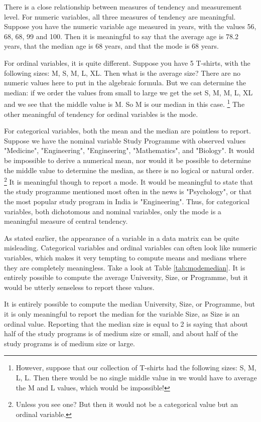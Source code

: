 \documentclass[]{book}\usepackage[]{graphicx}\usepackage[]{color}
\begin{document}
There is a close relationship between measures of tendency and measurement level. For numeric variables, all three measures of tendency are meaningful. Suppose you have the numeric variable age measured in years, with the values 56, 68, 68, 99 and 100. Then it is meaningful to say that the average age is 78.2 years, that the median age is 68 years, and that the mode is 68 years.

For ordinal variables, it is quite different. Suppose you have 5 T-shirts, with the following sizes: M, S, M, L, XL. Then what is the average size? There are no numeric values here to put in the algebraic formula. But we can determine the median: if we order the values from small to large we get the set S, M, M, L, XL and we see that the middle value is M. So M is our median in this case. \footnote{However, suppose that our collection of T-shirts had the following sizes: S, M, L, L. Then there would be no single middle value in we would have to average the M and L values, which would be impossible!} The other meaningful of tendency for ordinal variables is the mode.

For categorical variables, both the mean and the median are pointless to report. Suppose we have the nominal variable Study Programme with observed values "Medicine", "Engineering", "Engineering", "Mathematics", and "Biology". It would be impossible to derive a numerical mean, nor would it be possible to determine the middle value to determine the median, as there is no logical or natural order. \footnote{Unless you see one? But then it would not be a categorical value but an ordinal variable.} It is meaningful though to report a mode. It would be meaningful to state that the study programme mentioned most often in the news is "Psychology", or that the most popular study program in India is "Engineering". Thus, for categorical variables, both dichotomous and nominal variables, only the mode is a meaningful measure of central tendency.

As stated earlier, the appearance of a variable in a data matrix can be quite misleading. Categorical variables and ordinal variables can often look like numeric variables, which makes it very tempting to compute means and medians where they are completely meaningless. Take a look at Table \ref{tab:modemedian}. It is entirely possible to compute the average University, Size, or Programme, but it would be utterly senseless to report these values.

It is entirely possible to compute the median University, Size, or Programme, but it is only meaningful to report the median for the variable Size, as Size is an ordinal value. Reporting that the median size is equal to 2 is saying that about half of the study programs is of medium size or small, and about half of the study programs is of medium size or large.
\end{document}
